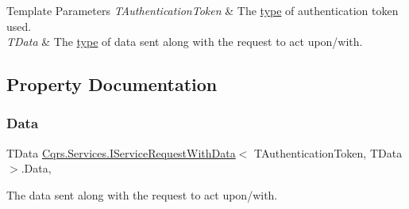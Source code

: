 \begin{DoxyTemplParams}{Template Parameters}
{\em T\+Authentication\+Token} & The \hyperlink{}{type} of authentication token used.\\
\hline
{\em T\+Data} & The \hyperlink{}{type} of data sent along with the request to act upon/with.\\
\hline
\end{DoxyTemplParams}


\subsection{Property Documentation}
\mbox{\label{interfaceCqrs_1_1Services_1_1IServiceRequestWithData_a6d2d68c5e99b9be14d2a0ee800eb87f3}} 
\subsubsection{\texorpdfstring{Data}{Data}}
{\footnotesize\ttfamily T\+Data \hyperlink{interfaceCqrs_1_1Services_1_1IServiceRequestWithData}{Cqrs.\+Services.\+I\+Service\+Request\+With\+Data}$<$ T\+Authentication\+Token, T\+Data $>$.Data\hspace{0.3cm}{\ttfamily [get]}, {\ttfamily [set]}}



The data sent along with the request to act upon/with. 

